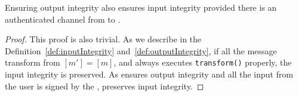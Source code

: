 \begin{lemma}
\label{theorem:th3}
Ensuring output integrity also ensures input integrity provided there is an authenticated channel from \user to \server.
\end{lemma}

\begin{proof}
This proof is also trivial. As we describe in the Definition~\ref{def:inputIntegrity} and~\ref{def:outputIntegrity}, if all the message transform from \host $[m']=[m]$, and \host always executes \texttt{transform()} properly, the input integrity is preserved. As \name ensures output integrity and all the input from the user is signed by the \device, \name preserves input integrity. 
\end{proof}


